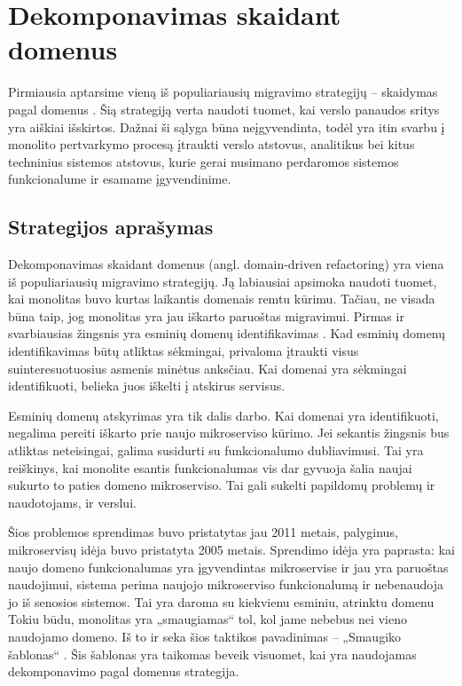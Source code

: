 \documentclass[fleqn]{VUMIFPSkursinis}
\begin{document}
\section{Dekomponavimas skaidant domenus}
Pirmiausia aptarsime vieną iš populiariausių migravimo strategijų – skaidymas pagal domenus \cite{Wal22}. Šią strategiją verta naudoti tuomet, kai verslo panaudos sritys yra aiškiai išskirtos. Dažnai  ši sąlyga būna neįgyvendinta, todėl yra itin svarbu į monolito pertvarkymo procesą įtraukti verslo atstovus, analitikus bei kitus techninius sistemos atstovus, kurie gerai nusimano perdaromos sistemos funkcionalume ir esamame įgyvendinime.

\subsection{Strategijos aprašymas}
Dekomponavimas skaidant domenus (angl. domain-driven refactoring) yra viena iš populiariausių migravimo strategijų. Ją labiausiai apsimoka naudoti tuomet, kai monolitas buvo kurtas laikantis domenais remtu kūrimu. Tačiau, ne visada būna taip, jog monolitas yra jau iškarto paruoštas migravimui. Pirmas ir svarbiausias žingsnis yra esminių domenų identifikavimas \cite{LZ22}. Kad esminių domenų identifikavimas būtų atliktas sėkmingai, privaloma įtraukti visus suinteresuotuosius asmenis minėtus anksčiau. Kai domenai yra sėkmingai identifikuoti, belieka juos iškelti į atskirus servisus.


Esminių domenų atskyrimas yra tik dalis darbo. Kai domenai yra identifikuoti, negalima pereiti iškarto prie naujo mikroserviso kūrimo. Jei sekantis žingsnis bus atliktas neteisingai, galima susidurti su funkcionalumo dubliavimusi. Tai yra reiškinys, kai monolite esantis funkcionalumas vis dar gyvuoja šalia naujai sukurto to paties domeno mikroserviso. Tai gali sukelti papildomų problemų ir naudotojams, ir verslui.


Šios problemos sprendimas buvo pristatytas jau 2011 metais, palyginus, mikroservisų idėja buvo pristatyta 2005 metais. Sprendimo idėja yra paprasta: kai naujo domeno funkcionalumas yra įgyvendintas mikroservise ir jau yra paruoštas naudojimui, sistema perima naujojo mikroserviso funkcionalumą ir nebenaudoja jo iš senosios sistemos. Tai yra daroma su kiekvienu esminiu, atrinktu domenu Tokiu būdu, monolitas yra „smaugiamas“ tol, kol jame nebebus nei vieno naudojamo domeno. Iš to ir seka šios taktikos pavadinimas – „Smaugiko šablonas“ \cite{Beh18}. Šis šablonas yra taikomas beveik visuomet, kai yra naudojamas dekomponavimo pagal domenus strategija.
\end{document}
